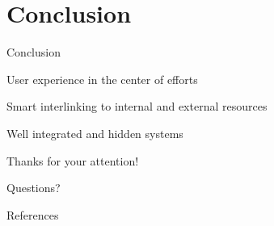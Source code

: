 \documentclass[10pt]{beamer}
\newcommand{\themename}{\textbf{\textsc{metropolis}}\xspace}
\begin{document}






\section{Conclusion}

\begin{frame}{Conclusion}

  User experience in the center of efforts

  Smart interlinking to internal and external resources

  Well integrated and hidden systems

\end{frame}

\begin{frame}[standout]
  Thanks for your attention!

  \bigskip
  \alert{Questions?}
\end{frame}

\begin{frame}[allowframebreaks]{References}

  \nocite{*}
  
  

\end{frame}
\end{document}
